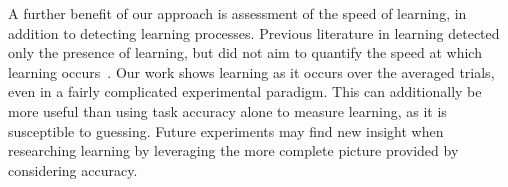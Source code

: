 A further benefit of our approach is assessment of the speed of learning, in 
addition to detecting learning processes. Previous literature in learning 
detected only the presence of learning, but did not aim to quantify the speed 
at which learning occurs~\cite{krigolson2014we}. Our work shows learning as it 
occurs over the averaged trials, even in a fairly complicated experimental 
paradigm. This can additionally be more useful than using task accuracy alone 
to measure learning, as it is susceptible to guessing. Future experiments may 
find new insight when researching learning by leveraging the more complete 
picture provided by considering \tvt accuracy.
